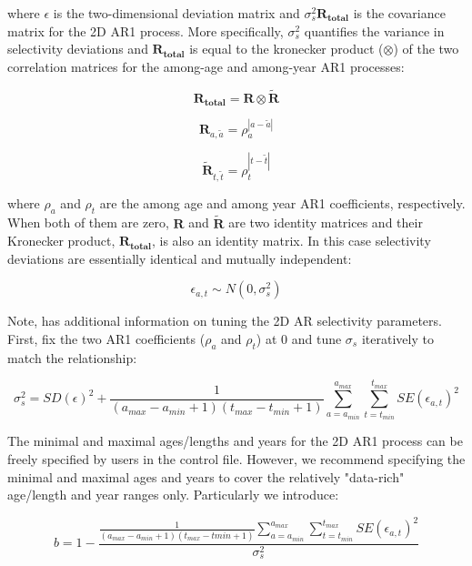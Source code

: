 where $\epsilon$ is the two-dimensional deviation matrix and $\sigma_s^2\mathbf{R_{total}}$ is the covariance matrix for the 2D AR1 process. More specifically, $\sigma_s^2$ quantifies the variance in selectivity deviations and $\mathbf{R_{total}}$ is equal to the kronecker product ($\otimes$) of the two correlation matrices for the among-age and among-year AR1 processes:

\begin{equation}
\mathbf{R_{total}}=\mathbf{R}\otimes\mathbf{\tilde{R}}
\end{equation}

\begin{equation}
\mathbf{R}_{a,\tilde{a}}=\rho_a^{|a-\tilde{a}|}
\end{equation}

\begin{equation}
\mathbf{\tilde{R}}_{t,\tilde{t}}=\rho_t^{|t-\tilde{t}|}
\end{equation}

where $\rho_a$ and $\rho_t$ are the among age and among year AR1 coefficients, respectively. When both of them are zero, $\mathbf{R}$ and $\mathbf{\tilde{R}}$ are two identity matrices and their Kronecker product, $\mathbf{R_{total}}$, is also an identity matrix. In this case selectivity deviations are essentially identical and mutually independent:

\begin{equation}
\epsilon_{a,t}\sim N(0,\sigma_s^2)
\end{equation} 

Note, \citet{xu-new-2019} has additional information on tuning the 2D AR selectivity parameters. First, fix the two AR1 coefficients ($\rho_a$ and $\rho_t$) at 0 and tune $\sigma_s$ iteratively to match the relationship:

\begin{equation}
\sigma_s^2=SD(\epsilon)^2+\frac{1}{(a_{max}-a_{min}+1)(t_{max}-t_{min}+1)}\sum_{a=a_{min}}^{a_{max}}\sum_{t=t_{min}}^{t_{max}}SE(\epsilon_{a,t})^2
\end{equation}

The minimal and maximal ages/lengths and years for the 2D AR1 process can be freely specified by users in the control file. However, we recommend specifying the minimal and maximal ages and years to cover the relatively "data-rich" age/length and year ranges only. Particularly we introduce: 

\begin{equation}
b=1-\frac{\frac{1}{(a_{max}-a_{min}+1)(t_{max}-t{min}+1)}\sum_{a=a_{min}}^{a_{max}}\sum_{t=t_{min}}^{t_{max}}SE(\epsilon_{a,t})^2}{\sigma_s^2}
\end{equation}

